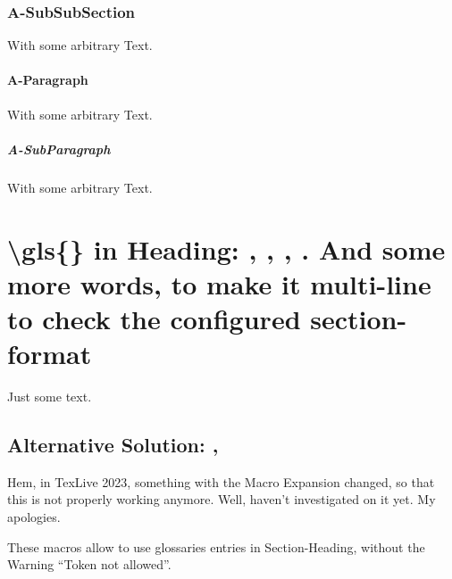 \subsubsection{A-SubSubSection}
With some arbitrary Text.

\paragraph{A-Paragraph}
With some arbitrary Text.

\subparagraph{A-SubParagraph}
With some arbitrary Text.





\section{\textbackslash gls\{\} in Heading:
	\texorpdfstring{}{DLL},
	\texorpdfstring{}{DLL},
	\texorpdfstring{}{DLLs},
	\texorpdfstring{}{DLLs}.
	And some more words, to make it multi-line to check the configured section-format
}

Just some text.



\edef\tokenA{\glsentrytext{dll}}
\edef\tokenB{\glsentrydesc{dll}}
\subsection{Alternative Solution: \texorpdfstring{\tokenA}{DLL}, \texorpdfstring{\tokenB}{DLL}}
Hem, in TexLive 2023, something with the Macro Expansion changed, so that this is not properly working anymore. Well, haven't investigated on it yet. My apologies.

These macros allow to use glossaries entries in Section-Heading, without the Warning \enquote{Token not allowed}.


